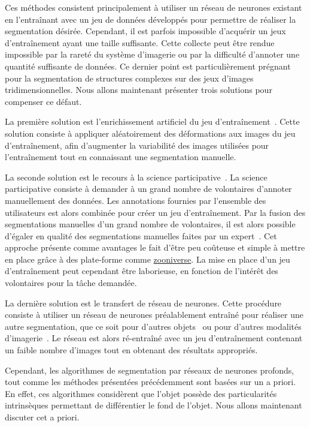 \documentclass[\main/main.tex]{subfiles}
\begin{document}
%
Ces méthodes consistent principalement à utiliser un réseau de neurones existant
en l'entraînant avec un jeu de données développés pour permettre de réaliser la segmentation désirée.
%
Cependant, il est parfois impossible d'acquérir un jeux d'entraînement ayant une taille suffisante.
%
Cette collecte peut être rendue impossible par la rareté du système d'imagerie ou par la difficulté d'annoter une quantité suffisante de données.
%
Ce dernier point est particulièrement prégnant pour la segmentation de structures complexes sur des jeux d'images tridimensionnelles.
%
Nous allons maintenant présenter trois solutions pour compenser ce défaut.

%
La première solution est l'enrichissement artificiel du jeu d'entraînement~\cite{milletari_2016,zhao_2019b,majurski_2019}.
%
Cette solution consiste à appliquer aléatoirement des déformations aux images du jeu d'entraînement,
afin d'augmenter la variabilité des images utilisées pour l'entraînement tout en connaissant une segmentation manuelle.

%
La seconde solution est le recours à la science participative~\cite{willi_2019,keshavan_2019}.
%
La science participative consiste à demander à un grand nombre de volontaires d'annoter manuellement des données.
%
Les annotations fournies par l'ensemble des utilisateurs est alors combinée pour créer un jeu d'entraînement.
%
Par la fusion des segmentations manuelles d'un grand nombre de volontaires,
il est alors possible d'égaler en qualité des segmentations manuelles faites par un expert~\cite{meakin_2019}.
%
Cet approche présente comme avantages le fait d'être peu coûteuse et simple à mettre en place grâce à des plate\hyp{}forme comme \href{https://www.zooniverse.org/}{zooniverse}.
%
La mise en place d'un jeu d'entraînement peut cependant être laborieuse,
en fonction de l'intérêt des volontaires pour la tâche demandée.

%
La dernière solution est le transfert de réseau de neurones.
%
Cette procédure consiste à utiliser un réseau de neurones préalablement entraîné pour réaliser une autre segmentation, que ce soit pour d'autres objets~\cite{wahab_2019} ou pour d'autres modalités d'imagerie~\cite{guo_2019}.
%
Le réseau est alors ré\hyp{}entraîné avec un jeu d'entraînement contenant un faible nombre d'images tout en obtenant des résultats appropriés.

Cependant, les algorithmes de segmentation par réseaux de neurones profonds, tout comme les méthodes présentées précédemment sont basées sur un a priori.
%
En effet, ces algorithmes considèrent que l'objet possède des particularités intrinsèques permettant de différentier le fond de l'objet.
%
Nous allons maintenant discuter cet a priori.
\end{document}
